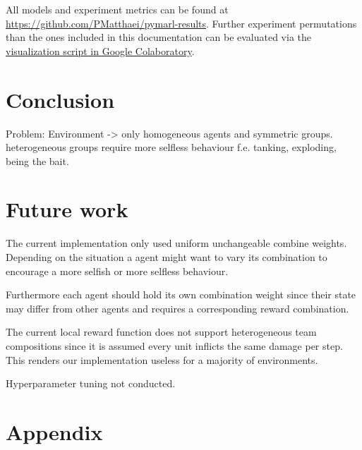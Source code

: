 All models and experiment metrics can be found at \url{https://github.com/PMatthaei/pymarl-results}. Further experiment permutations than the ones included in this documentation can be evaluated via the \href{https://github.com/PMatthaei/pymarl-results/blob/master/visualize_pymarl.ipynb}{visualization script in Google Colaboratory}.


\chapter{Conclusion}
 Problem: Environment -> only homogeneous agents and symmetric groups. heterogeneous groups require more selfless behaviour f.e. tanking, exploding, being the bait.
 
\chapter{Future work}
The current implementation only used uniform unchangeable combine weights. Depending on the situation a agent might want to vary its combination to encourage a more selfish or more selfless behaviour.

Furthermore each agent should hold its own combination weight since their state may differ from other agents and requires a corresponding reward combination.

The current local reward function does not support heterogeneous team compositions since it is assumed every unit inflicts the same damage per step. This renders our implementation useless for a majority of environments.

Hyperparameter tuning not conducted.

\appendix
\chapter{Appendix}
\newpage
